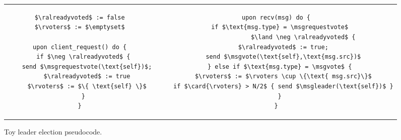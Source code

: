 
%

\begin{figure}
\begin{minipage}{\columnwidth}
\lstset{firstnumber=last}
\begin{tabular}{cc}
\begin{lstlisting}
$\ralreadyvoted$ := false
$\rvoters$ := $\emptyset$

upon client_request() do {
  if $\neg \ralreadyvoted$ {
    send $\msgrequestvote(\text{self})$;
    $\ralreadyvoted$ := true
    $\rvoters$ := $\{ \text{self} \}$
  }
}
\end{lstlisting} \hspace{0.2cm}
&
\begin{lstlisting}
upon recv(msg) do {
  if $\text{msg.type} = \msgrequestvote$
               $\land \neg \ralreadyvoted$ {
    $\ralreadyvoted$ := true;
    send $\msgvote(\text{self},\text{msg.src})$
  } else if $\text{msg.type} = \msgvote$ {
    $\rvoters$ := $\rvoters \cup \{\text{ msg.src}\}$
    if $\card{\rvoters} > N/2$ { send $\msgleader(\text{self})$ }
  }
}
\end{lstlisting}
\end{tabular}
\end{minipage}
\caption{\label{fig:toy-c}Toy leader election pseudocode.}
\end{figure}

